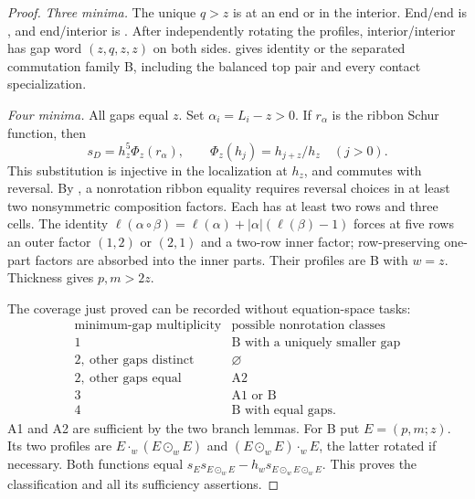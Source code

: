 \documentclass[11pt,a4paper]{amsart}
\numberwithin{equation}{section}
\theoremstyle{plain}
\theoremstyle{definition}
\begin{document}
\begin{proof}
\emph{Three minima.}
The unique \(q>z\) is at an end or in the interior.  End/end is
, and end/interior is
.  After independently rotating the
profiles, interior/interior has gap word \((z,q,z,z)\) on both sides.
 gives identity or the separated
commutation family B, including the balanced top pair and every
contact specialization.

\emph{Four minima.}
All gaps equal \(z\).  Set \(\alpha_i=L_i-z>0\).
If \(r_\alpha\) is the ribbon Schur function, then
\[
 s_D=h_z^5\Phi_z(r_\alpha),\qquad
 \Phi_z(h_j)=h_{j+z}/h_z\quad(j>0).
\]
This substitution is injective in the localization at \(h_z\), and
commutes with reversal.  By
\cite{Billera2006DecomposableCompositions}, a nonrotation ribbon equality
requires reversal choices in at least two nonsymmetric composition
factors.  Each has at least two rows and three cells.  The identity
\(\ell(\alpha\circ\beta)=\ell(\alpha)+|\alpha|(\ell(\beta)-1)\)
forces at five rows an outer factor \((1,2)\) or \((2,1)\) and a
two-row inner factor; row-preserving one-part factors are absorbed into
the inner parts.  Their profiles are B with \(w=z\).  Thickness gives
\(p,m>2z\).

The coverage just proved can be recorded without equation-space tasks:
\begin{equation}\label{eq:staircase-inventory}
\begin{array}{c|c}
\text{minimum-gap multiplicity}&\text{possible nonrotation classes}\\\hline
1&\mathrm B\text{ with a uniquely smaller gap}\\
2,\ \text{other gaps distinct}&\varnothing\\
2,\ \text{other gaps equal}&\mathrm{A2}\\
3&\mathrm{A1}\text{ or }\mathrm B\\
4&\mathrm B\text{ with equal gaps}.
\end{array}
\end{equation}
A1 and A2 are sufficient by the two branch lemmas.  For B put
\(E=(p,m;z)\).  Its two profiles are
\(E\cdot_w(E\odot_wE)\) and
\((E\odot_wE)\cdot_wE\), the latter rotated if necessary.
Both functions equal
\(s_Es_{E\odot_wE}-h_ws_{E\odot_wE\odot_wE}\).
This proves the classification and all its sufficiency assertions.
\end{proof}
\end{document}
